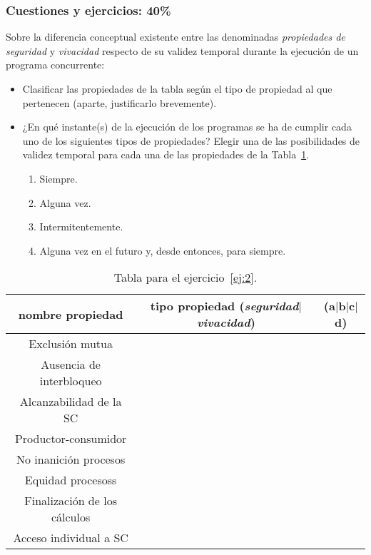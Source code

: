 \documentclass[12pt]{article}
\begin{document}
    \subsubsection*{Cuestiones y ejercicios: 40\%}
    \begin{ejercicio}\label{ej:2}
        Sobre la diferencia conceptual existente entre las denominadas \textit{propiedades de seguridad} y \textit{vivacidad} respecto de su validez temporal durante la ejecución de un programa concurrente:
        \begin{itemize}
            \item Clasificar las propiedades de la tabla según el tipo de propiedad al que pertenecen (aparte, justificarlo brevemente).
            \item ¿En qué instante(s) de la ejecución de los programas se ha de cumplir cada uno de los siguientes tipos de propiedades? Elegir una de las posibilidades de validez temporal para cada una de las propiedades de la Tabla~\ref{tab:ej_2}.
                \begin{enumerate}[label=(\alph*)]
                    \item Siempre.
                    \item Alguna vez.
                    \item Intermitentemente.
                    \item Alguna vez en el futuro y, desde entonces, para siempre.
                \end{enumerate}
        \end{itemize}
        \begin{table}[H]
        \centering
        \begin{tabular}{|c|c|c|}
            \hline
            \textbf{nombre propiedad} & \textbf{tipo propiedad} (\textit{seguridad}$|$\textit{vivacidad}) & (\textbf{a}$|$\textbf{b}$|$\textbf{c}$|$\textbf{d}) \\
            \hline
            Exclusión mutua & & \\
            \hline
            Ausencia de interbloqueo & & \\
            \hline
            Alcanzabilidad de la SC & & \\
            \hline
            Productor-consumidor & & \\
            \hline
            No inanición procesos & & \\
            \hline
            Equidad procesoss & & \\
            \hline
            Finalización de los cálculos & & \\
            \hline
            Acceso individual a SC & & \\
            \hline
        \end{tabular}
        \label{tab:ej_2}
        \caption{Tabla para el ejercicio~\ref{ej:2}.}
        \end{table}
    \end{ejercicio}
\end{document}
